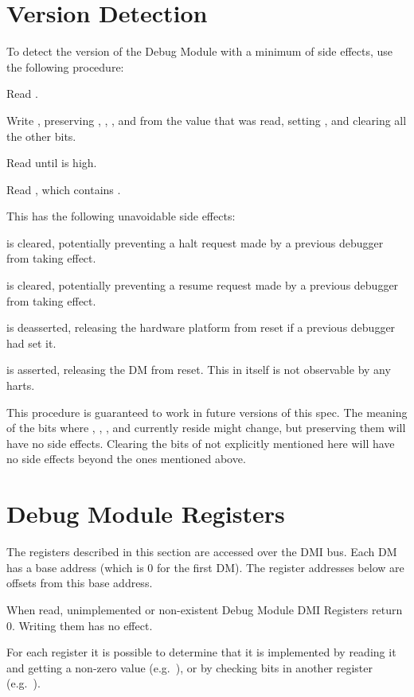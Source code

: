 \section{Version Detection}

\begin{steps}{To detect the version of the Debug Module with a minimum of side
    effects, use the following procedure:}
    \item Read \RdmDmcontrol.
    \item Write \RdmDmcontrol, preserving \FdmDmcontrolHartreset, \FdmDmcontrolHasel, \FdmDmcontrolHartsello, and
        \FdmDmcontrolHartselhi from the value that was read, setting \FdmDmcontrolDmactive, and
        clearing all the other bits.
    \item Read \RdmDmcontrol until \FdmDmcontrolDmactive is high.
    \item Read \RdmDmstatus, which contains \FdmDmstatusVersion.
\end{steps}

\begin{steps}{This has the following unavoidable side effects:}
    \item \FdmDmcontrolHaltreq is cleared, potentially preventing a halt request made by a
        previous debugger from taking effect.
    \item \FdmDmcontrolResumereq is cleared, potentially preventing a resume request made
        by a previous debugger from taking effect.
    \item \FdmDmcontrolNdmreset is deasserted, releasing the hardware platform from reset if a
        previous debugger had set it.
    \item \FdmDmcontrolDmactive is asserted, releasing the DM from reset. This in itself
        is not observable by any harts.
\end{steps}

This procedure is guaranteed to work in future versions of this spec.  The
meaning of the \RdmDmcontrol bits where \FdmDmcontrolHartreset, \FdmDmcontrolHasel, \FdmDmcontrolHartsello, and
\FdmDmcontrolHartselhi currently reside might change, but preserving them will have no
side effects. Clearing the bits of \RdmDmcontrol not explicitly mentioned here
will have no side effects beyond the ones mentioned above.

\section{Debug Module Registers} \label{dmdebbus}

The registers described in this section are accessed over the DMI bus.  Each DM
has a base address (which is 0 for the first DM). The register addresses below
are offsets from this base address.

When read, unimplemented or non-existent Debug Module DMI Registers return 0.
Writing them has no effect.

For each register it is possible to determine that it is implemented by reading
it and getting a non-zero value (e.g.\ \RdmSbcs), or by checking bits in another
register (e.g.\ \FdmAbstractcsProgbufsize).


